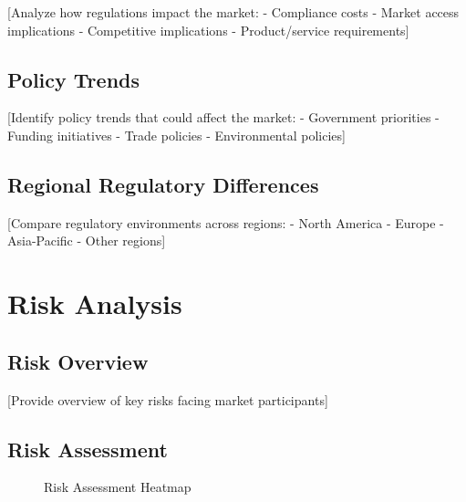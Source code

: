 \documentclass[11pt,letterpaper]{report}
\begin{document}
[Analyze how regulations impact the market:
- Compliance costs
- Market access implications
- Competitive implications
- Product/service requirements]

\section{Policy Trends}

[Identify policy trends that could affect the market:
- Government priorities
- Funding initiatives
- Trade policies
- Environmental policies]

\section{Regional Regulatory Differences}

[Compare regulatory environments across regions:
- North America
- Europe
- Asia-Pacific
- Other regions]

\chapter{Risk Analysis}

\section{Risk Overview}

[Provide overview of key risks facing market participants]

\section{Risk Assessment}


\begin{figure}[htbp]
\centering
\caption{Risk Assessment Heatmap}
\label{fig:risk_heatmap}
\end{figure}
\end{document}
